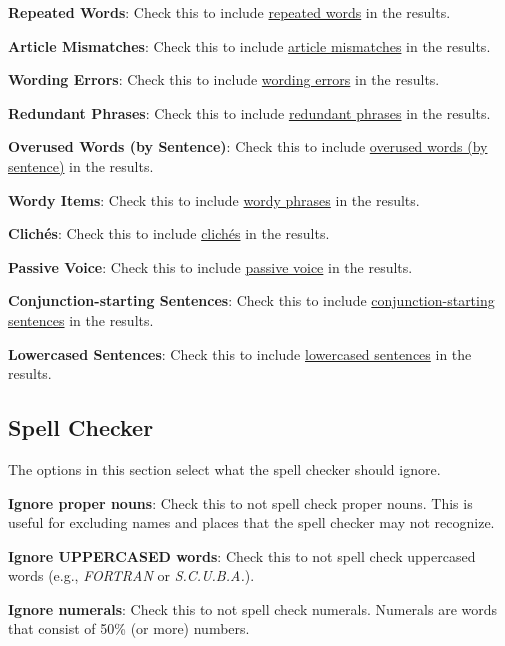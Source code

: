\documentclass[
]{book}
\theoremstyle{definition}
\theoremstyle{definition}
\theoremstyle{definition}
\theoremstyle{definition}
\theoremstyle{remark}
\begin{document}
\textbf{Repeated Words}: Check this to include \protect\hyperlink{reviewing-repeated-words}{repeated words} in the results.

\textbf{Article Mismatches}: Check this to include \protect\hyperlink{reviewing-article-mismatches}{article mismatches} in the results.

\textbf{Wording Errors}: Check this to include \protect\hyperlink{reviewing-wording-errors}{wording errors} in the results.

\textbf{Redundant Phrases}: Check this to include \protect\hyperlink{reviewing-redundant-phrases}{redundant phrases} in the results.

\textbf{Overused Words (by Sentence)}: Check this to include \protect\hyperlink{reviewing-overused-by-sentence}{overused words (by sentence)} in the results.

\textbf{Wordy Items}: Check this to include \protect\hyperlink{reviewing-wordy-items}{wordy phrases} in the results.

\textbf{Clichés}: Check this to include \protect\hyperlink{reviewing-cliches}{clichés} in the results.

\textbf{Passive Voice}: Check this to include \protect\hyperlink{reviewing-passive-voice}{passive voice} in the results.

\textbf{Conjunction-starting Sentences}: Check this to include \protect\hyperlink{reviewing-conjunction-sentences}{conjunction-starting sentences} in the results.

\textbf{Lowercased Sentences}: Check this to include \protect\hyperlink{reviewing-lowercased-sentences}{lowercased sentences} in the results.

\hypertarget{options-spell-check}{%
\subsection*{Spell Checker}\label{options-spell-check}}

The options in this section select what the spell checker should ignore.

\textbf{Ignore proper nouns}: Check this to not spell check proper nouns. This is useful for excluding names and places that the spell checker may not recognize.

\textbf{Ignore UPPERCASED words}: Check this to not spell check uppercased words (e.g., \emph{FORTRAN} or \emph{S.C.U.B.A.}).

\textbf{Ignore numerals}: Check this to not spell check numerals. Numerals are words that consist of 50\% (or more) numbers.
\end{document}
